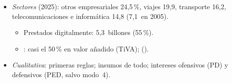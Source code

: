 \documentclass{article}
\begin{document}
\begin{columnas}
\begin{itemize}
\item \emph{Sectores} (2025): otros empresariales 24,5\,\%, viajes 19,9, transporte 16,2, telecomunicaciones e informática 14,8 (7,1~en 2005).
  \begin{itemize}
  \item Prestados digitalmente: 5,3~billones (55\,\%).
  \item {}: casi el 50\,\% en valor añadido (TiVA);  ().
  \end{itemize}
\item \emph{Cualitativa}: primeras reglas; insumos de todo; intereses ofensivos (PD) y defensivos (PED, salvo modo~4).
\end{itemize}


\end{columnas}
\end{document}
